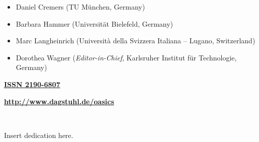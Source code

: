 \documentclass[a4paper,UKenglish]{oasicsmaster-v2016}
\begin{document}
\begin{publicationinfo}
\begin{itemize}
\item Daniel Cremers (TU M\"unchen, Germany)
\item Barbara Hammer (Universit\"at Bielefeld, Germany)
\item Marc Langheinrich (Universit\`a della Svizzera Italiana -- Lugano, Switzerland)
\item Dorothea Wagner (\emph{Editor-in-Chief}, Karlsruher Institut f\"{u}r Technologie, Germany)
 \end{itemize}
 
\bigskip
\bigskip
\bigskip

{\large\bf\sffamily \href{http://www.dagstuhl.de/dagpub/2190-6807}{ISSN 2190-6807}}

\bigskip
\bigskip
\bigskip

{\Large\bf\sffamily \href{http://www.dagstuhl.de/oasics}{http://www.dagstuhl.de/oasics}}
 
\vfill

 
\newpage
 
\thispagestyle{empty}

\ \\

\end{publicationinfo}


\begin{dedication}%
  Insert dedication here.
\end{dedication}
\end{document}
